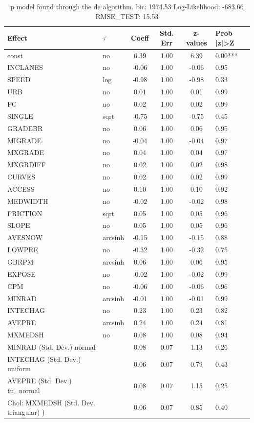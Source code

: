 \begin{table}
	\caption{p model found through the de algorithm. bic: 1974.53 Log-Likelihood: -683.66 RMSE_TEST: 15.53}
	\begin{center}
		\begin{tabular}{|l|l|c|c|c|l|}
			\hline
			Effect & $\tau$ & Coeff & Std. Err & z-values & Prob |z|>Z \\
			\hline
			const & no & 6.39 & 1.00 & 6.39 & 0.00*** \\
			\hline
			INCLANES & no & -0.06 & 1.00 & -0.06 & 0.95 \\
			\hline
			SPEED & log & -0.98 & 1.00 & -0.98 & 0.33 \\
			\hline
			URB & no & 0.01 & 1.00 & 0.01 & 0.99 \\
			\hline
			FC & no & 0.02 & 1.00 & 0.02 & 0.99 \\
			\hline
			SINGLE & sqrt & -0.75 & 1.00 & -0.75 & 0.45 \\
			\hline
			GRADEBR & no & 0.06 & 1.00 & 0.06 & 0.95 \\
			\hline
			MIGRADE & no & -0.04 & 1.00 & -0.04 & 0.97 \\
			\hline
			MXGRADE & no & 0.04 & 1.00 & 0.04 & 0.97 \\
			\hline
			MXGRDIFF & no & 0.02 & 1.00 & 0.02 & 0.98 \\
			\hline
			CURVES & no & 0.02 & 1.00 & 0.02 & 0.99 \\
			\hline
			ACCESS & no & 0.10 & 1.00 & 0.10 & 0.92 \\
			\hline
			MEDWIDTH & no & -0.02 & 1.00 & -0.02 & 0.98 \\
			\hline
			FRICTION & sqrt & 0.05 & 1.00 & 0.05 & 0.96 \\
			\hline
			SLOPE & no & 0.05 & 1.00 & 0.05 & 0.96 \\
			\hline
			AVESNOW & arcsinh & -0.15 & 1.00 & -0.15 & 0.88 \\
			\hline
			LOWPRE & no & -0.32 & 1.00 & -0.32 & 0.75 \\
			\hline
			GBRPM & arcsinh & 0.06 & 1.00 & 0.06 & 0.95 \\
			\hline
			EXPOSE & no & -0.02 & 1.00 & -0.02 & 0.99 \\
			\hline
			CPM & no & -0.06 & 1.00 & -0.06 & 0.96 \\
			\hline
			MINRAD & arcsinh & -0.01 & 1.00 & -0.01 & 0.99 \\
			\hline
			INTECHAG & no & 0.23 & 1.00 & 0.23 & 0.82 \\
			\hline
			AVEPRE & arcsinh & 0.24 & 1.00 & 0.24 & 0.81 \\
			\hline
			MXMEDSH & no & 0.08 & 1.00 & 0.08 & 0.94 \\
			\hline
			MINRAD (Std. Dev.) normal &  & 0.08 & 0.07 & 1.13 & 0.26 \\
			\hline
			INTECHAG (Std. Dev.) uniform &  & 0.06 & 0.07 & 0.79 & 0.43 \\
			\hline
			AVEPRE (Std. Dev.) tn_normal &  & 0.08 & 0.07 & 1.15 & 0.25 \\
			\hline
			 Chol: MXMEDSH (Std. Dev. triangular) ) &  & 0.06 & 0.07 & 0.85 & 0.40 \\
			\hline
		\end{tabular}
	\end{center}
\end{table}